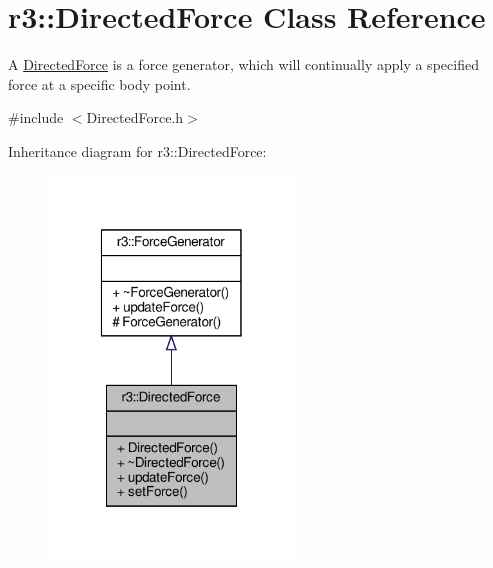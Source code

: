 \hypertarget{classr3_1_1_directed_force}{}\section{r3\+:\+:Directed\+Force Class Reference}
\label{classr3_1_1_directed_force}


A \mbox{\hyperlink{classr3_1_1_directed_force}{Directed\+Force}} is a force generator, which will continually apply a specified force at a specific body point.  




{\ttfamily \#include $<$Directed\+Force.\+h$>$}



Inheritance diagram for r3\+:\+:Directed\+Force\+:\nopagebreak
\begin{figure}[H]
\begin{center}
\leavevmode
\includegraphics[width=185pt]{classr3_1_1_directed_force__inherit__graph}
\end{center}
\end{figure}


